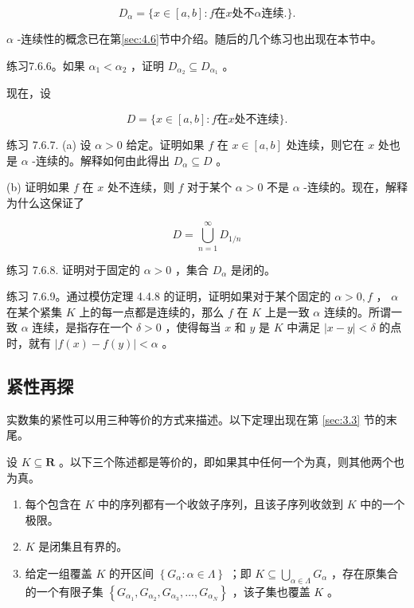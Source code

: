 \begin{equation}
\label{eq:7.6.1}
{D}_{\alpha } = \{ x \in  \left\lbrack  {a,b}\right\rbrack   : f  \text{在}x \text{处不} \alpha \text{连续}.\} .
\end{equation}


\(\alpha\) -连续性的概念已在第\ref{sec:4.6}节中介绍。随后的几个练习也出现在本节中。

练习7.6.6。如果 \({\alpha }_{1} < {\alpha }_{2}\) ，证明 \({D}_{{\alpha }_{2}} \subseteq  {D}_{{\alpha }_{1}}\) 。

现在，设

\begin{equation}
\label{eq:7.6.2}
D = \{ x \in  \left\lbrack  {a,b}\right\rbrack   : f  \text{在}x \text{处不连续}\} .
\end{equation}

练习 7.6.7. (a) 设 \(\alpha  > 0\) 给定。证明如果 \(f\) 在 \(x \in  \left\lbrack  {a,b}\right\rbrack\) 处连续，则它在 \(x\) 处也是 \(\alpha\) -连续的。解释如何由此得出 \({D}_{\alpha } \subseteq  D\) 。

(b) 证明如果 \(f\) 在 \(x\) 处不连续，则 \(f\) 对于某个 \(\alpha  > 0\) 不是 \(\alpha\) -连续的。现在，解释为什么这保证了

\[
D = \mathop{\bigcup }\limits_{{n = 1}}^{\infty }{D}_{1/n}
\]

练习 7.6.8. 证明对于固定的 \(\alpha  > 0\) ，集合 \({D}_{\alpha }\) 是闭的。

练习 7.6.9。通过模仿定理 4.4.8 的证明，证明如果对于某个固定的 \(\alpha  > 0,f\) ， \(\alpha\) 在某个紧集 \(K\) 上的每一点都是连续的，那么 \(f\) 在 \(K\) 上是一致 \(\alpha\) 连续的。所谓一致 \(\alpha\) 连续，是指存在一个 \(\delta  > 0\) ，使得每当 \(x\) 和 \(y\) 是 \(K\) 中满足 \(\left| {x - y}\right|  < \delta\) 的点时，就有 \(\left| {f\left( x\right)  - f\left( y\right) }\right|  < \alpha\) 。

\subsection{紧性再探}

实数集的紧性可以用三种等价的方式来描述。以下定理出现在第 \ref{sec:3.3} 节的末尾。

\begin{Thm}
  \label{thm:7.6.4}
  设 \(K \subseteq  \mathbf{R}\) 。以下三个陈述都是等价的，即如果其中任何一个为真，则其他两个也为真。
\begin{enumerate}[label = (\roman*)]
\item\label{item:7.6.1} 每个包含在 \(K\) 中的序列都有一个收敛子序列，且该子序列收敛到 \(K\) 中的一个极限。
\item\label{item:7.6.2} \(K\) 是闭集且有界的。
\item\label{item:7.6.3}给定一组覆盖 \(K\) 的开区间 \(\left\{  {{G}_{\alpha } : \alpha  \in  \Lambda }\right\}\) ；即 \(K \subseteq  \mathop{\bigcup }\limits_{{\alpha  \in  \Lambda }}{G}_{\alpha }\) ，存在原集合的一个有限子集 \(\left\{  {{G}_{{\alpha }_{1}},{G}_{{\alpha }_{2}},{G}_{{\alpha }_{3}},\ldots ,{G}_{{\alpha }_{N}}}\right\}\) ，该子集也覆盖 \(K\) 。
\end{enumerate}
\end{Thm}


